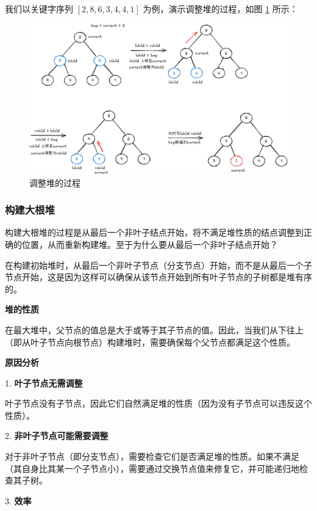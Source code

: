 \documentclass[lang=cn,newtx,10pt,scheme=chinese]{../elegantbook}
\begin{document}
我们以关键字序列 $[2,8,6,3,4,4,1]$ 为例，演示调整堆的过程，如图 \ref{fig:adjustHeap} 所示：

\begin{figure}
[!htbp]
    \centering
    \includegraphics[width=1\textwidth]{./figure/pdf/cropped/heapAdjust.pdf}
    \caption{调整堆的过程}
    \label{fig:adjustHeap}
\end{figure}

\subsubsection{构建大根堆}

构建大根堆的过程是从最后一个非叶子结点开始，将不满足堆性质的结点调整到正确的位置，从而重新构建堆。至于为什么要从最后一个非叶子结点开始？

在构建初始堆时，从最后一个非叶子节点（分支节点）开始，而不是从最后一个子节点开始，这是因为这样可以确保从该节点开始到所有叶子节点的子树都是堆有序的。


\textbf{堆的性质}  

在最大堆中，父节点的值总是大于或等于其子节点的值。因此，当我们从下往上（即从叶子节点向根节点）构建堆时，需要确保每个父节点都满足这个性质。


\textbf{原因分析}  

1. \textbf{叶子节点无需调整}  

   叶子节点没有子节点，因此它们自然满足堆的性质（因为没有子节点可以违反这个性质）。

2. \textbf{非叶子节点可能需要调整}  

   对于非叶子节点（即分支节点），需要检查它们是否满足堆的性质。如果不满足（其自身比其某一个子节点小），需要通过交换节点值来修复它，并可能递归地检查其子树。

3. \textbf{效率}  
\end{document}
